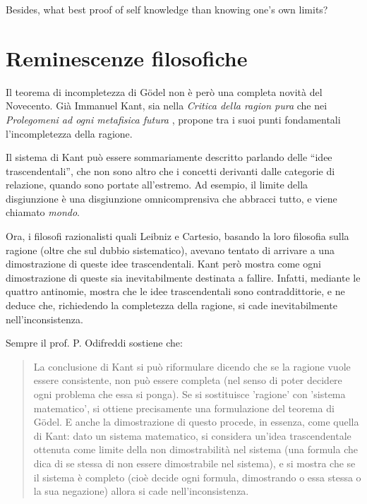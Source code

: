 \documentclass[a4paper,10pt]{article}
\begin{document}
Besides, what best proof of self knowledge than knowing one's own limits?

\section{Reminescenze filosofiche}

Il teorema di incompletezza di Gödel non è però una completa novità del Novecento. Già Immanuel Kant, sia nella \textit{Critica della ragion pura} \cite{critica-ragion-pura} che nei \textit{Prolegomeni ad ogni metafisica futura} \cite{prolegomeni}, propone tra i suoi punti fondamentali l'incompletezza della ragione.

Il sistema di Kant può essere sommariamente descritto parlando delle \textquotedblleft idee trascendentali\textquotedblright, che non sono altro che i concetti derivanti dalle categorie di relazione, quando sono portate all'estremo. Ad esempio, il limite della disgiunzione è una disgiunzione omnicomprensiva che abbracci tutto, e viene chiamato \textit{mondo}.

Ora, i filosofi razionalisti quali Leibniz e Cartesio, basando la loro filosofia sulla ragione (oltre che sul dubbio sistematico), avevano tentato di arrivare a una dimostrazione di queste idee trascendentali.
Kant però mostra come ogni dimostrazione di queste sia inevitabilmente destinata a fallire. Infatti, mediante le quattro antinomie, mostra che le idee trascendentali sono contraddittorie, e ne deduce che, richiedendo la completezza della ragione, si cade inevitabilmente nell'inconsistenza.

Sempre il prof. P. Odifreddi sostiene \cite{metamorfosi} che:
\begin{quotation}
La conclusione di Kant si può riformulare dicendo che se la ragione vuole essere consistente, non può essere completa (nel senso di
poter decidere ogni problema che essa si ponga). Se si sostituisce 'ragione' con 'sistema matematico', si ottiene precisamente una
formulazione del teorema di Gödel. E anche la dimostrazione di questo procede, in essenza, come quella di Kant: dato un
sistema matematico, si considera un'idea trascendentale ottenuta come limite della non dimostrabilità nel sistema (una formula
che dica di se stessa di non essere dimostrabile nel sistema), e si mostra che se il sistema è completo (cioè decide ogni formula,
dimostrando o essa stessa o la sua negazione) allora si cade nell'inconsistenza.

\end{quotation}
\end{document}

